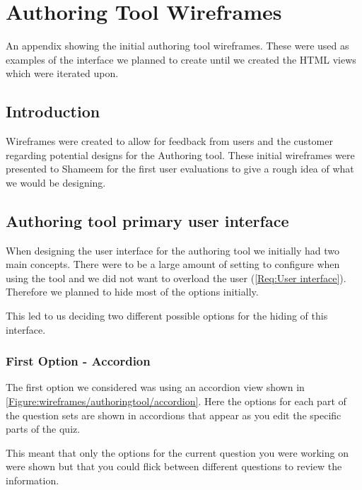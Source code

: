 \chapter{Authoring Tool Wireframes} \label{Chapter:Authoring Tool Wireframes}

\begin{preamble}
	An appendix showing the initial authoring tool wireframes. These were used as examples of the interface we planned to create until we created the HTML views which were iterated upon.
\end{preamble}

\section{Introduction}

Wireframes were created to allow for feedback from users and the customer regarding potential designs for the Authoring tool. These initial wireframes were presented to Shameem for the first user evaluations to give a rough idea of what we would be designing.

\section{Authoring tool primary user interface}

When designing the user interface for the authoring tool we initially had two main concepts. There were to be a large amount of setting to configure when using the tool and we did not want to overload the user (\cref{Req:User interface}). Therefore we planned to hide most of the options initially.

This led to us deciding two different possible options for the hiding of this interface.

\subsection{First Option - Accordion} 

The first option we considered was using an accordion view shown in \autoref{Figure:wireframes/authoringtool/accordion}. Here the options for each part of the question sets are shown in accordions that appear as you edit the specific parts of the quiz.

This meant that only the options for the current question you were working on were shown but that you could flick between different questions to review the information.

